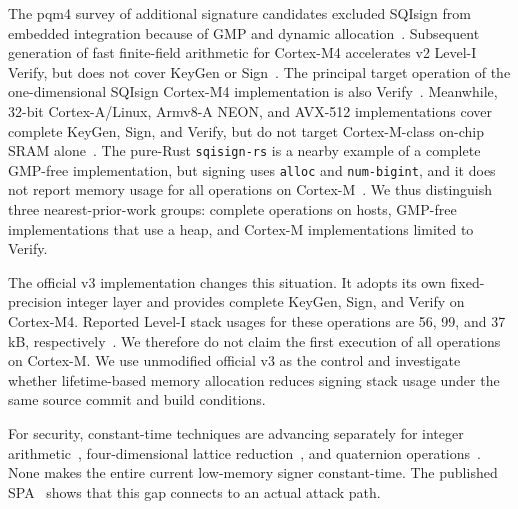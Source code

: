 \documentclass[a4paper,10pt]{article}
\theoremstyle{definition}
\theoremstyle{remark}
\begin{document}
The pqm4 survey of additional signature candidates excluded SQIsign from embedded integration because of GMP and dynamic allocation~\cite{pqm4-2024}. Subsequent generation of fast finite-field arithmetic for Cortex-M4 accelerates v2 Level-I Verify, but does not cover KeyGen or Sign~\cite{m4-modarith-2025}. The principal target operation of the one-dimensional SQIsign Cortex-M4 implementation is also Verify~\cite{sqisign-1d-2024}. Meanwhile, 32-bit Cortex-A/Linux, Armv8-A NEON, and AVX-512 implementations cover complete KeyGen, Sign, and Verify, but do not target Cortex-M-class on-chip SRAM alone~\cite{sqisign-32bit-2024,sqisign-arm-2026,sqisign-avx512-2026}. The pure-Rust \texttt{sqisign-rs} is a nearby example of a complete GMP-free implementation, but signing uses \texttt{alloc} and \texttt{num-bigint}, and it does not report memory usage for all operations on Cortex-M~\cite{sqisign-rs-2026}. We thus distinguish three nearest-prior-work groups: complete operations on hosts, GMP-free implementations that use a heap, and Cortex-M implementations limited to Verify.

The official v3 implementation changes this situation. It adopts its own fixed-precision integer layer and provides complete KeyGen, Sign, and Verify on Cortex-M4. Reported Level-I stack usages for these operations are 56, 99, and 37 kB, respectively~\cite{sqisign-spec-v3,sqisign-code-v3}. We therefore do not claim the first execution of all operations on Cortex-M. We use unmodified official v3 as the control and investigate whether lifetime-based memory allocation reduces signing stack usage under the same source commit and build conditions.

For security, constant-time techniques are advancing separately for integer arithmetic~\cite{ct-integer-2025}, four-dimensional lattice reduction~\cite{ct-lattice-2025}, and quaternion operations~\cite{ct-quaternion-2025}. None makes the entire current low-memory signer constant-time. The published SPA~\cite{spa-2025} shows that this gap connects to an actual attack path.
\end{document}
